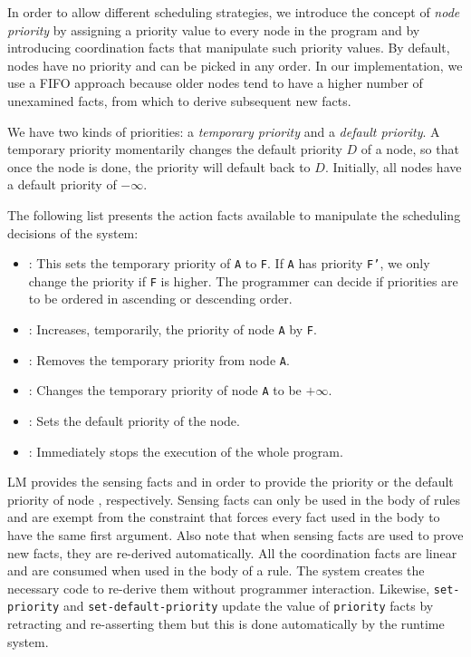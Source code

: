
In order to allow different scheduling strategies, we introduce the concept of
\emph{node priority} by assigning a priority value to every node in the program
and by introducing coordination facts that manipulate such priority values.  By
default, nodes have no priority and can be picked in any order. In our
implementation, we use a FIFO approach because older nodes tend to have a higher
number of unexamined facts, from which to derive subsequent new facts.

We have two kinds of priorities: a \emph{temporary priority} and a \emph{default
   priority}. A temporary priority momentarily changes the default priority $D$
of a node, so that once the node is done, the priority will default back to $D$.
Initially, all nodes have a default priority of $-\infty$.

The following list presents the action facts available to manipulate the
scheduling decisions of the system:

\begin{itemize}
   \item {}: This sets the
   temporary priority of \texttt{A} to \texttt{F}. If \texttt{A} has priority
   \texttt{F'}, we only change the priority if \texttt{F} is higher. The programmer
   can decide if priorities are to be ordered in ascending or descending order.
   \item {}: Increases,
   temporarily, the priority of node \texttt{A} by \texttt{F}.
   \item {}: Removes the temporary priority from node
   \texttt{A}.
   \item {}: Changes the temporary priority of node
   \texttt{A} to be $+\infty$.
   \item {}: Sets the default
   priority of the node.
   \item {}: Immediately stops the execution of the whole program.
\end{itemize}

LM provides the sensing facts  and
 in order to provide the priority
 or the default priority  of node , respectively.
Sensing facts can only be used in the body of rules and are exempt from the
constraint that forces every fact used in the body to have the same first
argument. Also note that when sensing facts are used to prove new facts, they
are re-derived automatically. All the coordination facts are linear and are
consumed when used in the body of a rule.  The system creates the necessary code
to re-derive them without programmer interaction. Likewise,
\texttt{set-priority} and \texttt{set-default-priority} update the value of
\texttt{priority} facts by retracting and re-asserting them but this is done
automatically by the runtime system.

